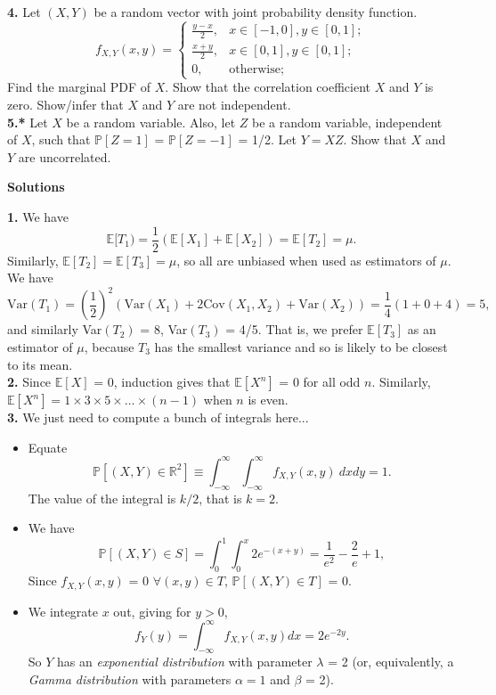 \documentclass[aps,prl,groupedaddress,amsmath,amssymb,nofootinbib,12pt]{revtex4-1}
\begin{document}
\textbf{4.} Let $(X, Y)$ be a random vector with joint probability density function.
\begin{equation}
f_{X,Y}(x,y) = \begin{cases} \frac{y-x}{2}, & x\in [-1,0], y\in [0,1];\\ \frac{x+y}{2}, & x\in [0,1], y\in [0,1];\\ 0, & \text{otherwise}; \end{cases}
\end{equation}
Find the marginal PDF of $X$. Show that the correlation coefficient $X$ and $Y$ is zero.
Show/infer that $X$ and $Y$ are not independent.\\

\textbf{5.*} Let $X$ be a random variable. Also, let $Z$ be a random variable, independent of $X$, such that $\mathbb{P}[Z =1]$ = $\mathbb{P}[Z =-1]$ = 1/2. Let $Y = XZ$. Show that $X$ and $Y$ are uncorrelated.
\pagebreak

\textbf{Solutions\\}

\textbf{1.} We have 
\[\mathbb{E}[T_1) = \frac{1}{2} (\mathbb{E}[X_1] + \mathbb{E}[X_2]) = \mathbb{E}[T_2] = \mu.\]
Similarly, $\mathbb{E}[T_2] = \mathbb{E}[T_3] = \mu$, so all are unbiased when used as estimators of $\mu$. We have 
\[\text{Var}(T_1) = \left(\frac{1}{2}\right)^2\left(\text{Var}(X_1) + 2 \text{Cov}(X_1, X_2) + \text{Var}(X_2)\right) = \frac{1}{4}(1 + 0 + 4) = 5,
\]
and similarly Var$(T_2)$ = 8, Var$(T_3)$ = 4/5. That is, we prefer $\mathbb{E}[T_3]$ as an estimator of $\mu$, because $T_3$ has the smallest variance and so is likely to be closest to its mean.\\

\textbf{2.} Since $\mathbb{E}[X]$ = 0, induction gives that $\mathbb{E}[X^n
]$ = 0 for all odd $n$. Similarly, $\mathbb{E}[X^n] = 1\times 3 \times 5 \times \ldots \times (n-1)$ when $n$ is even.\\

\textbf{3.} We just need to compute a bunch of integrals here...
\begin{itemize}
\item
Equate
\[\mathbb{P}[(X, Y ) \in \mathbb{R}^2] \equiv \int_{-\infty}^\infty\int_{-\infty}^\infty f_{X,Y} (x,y)~dxdy = 1.\]
The value of the integral is $k/2$, that is $k=2$.
\item We have
\[\mathbb{P}[(X, Y ) \in S] = \int_0^1\int_0^x 2e^{-(x+y)} = \frac{1}{e^2} -\frac{2}{e}+1,\]
Since $f_{X,Y} (x, y)$ = 0 $\forall (x, y) \in T$, $\mathbb{P}[(X, Y ) \in T]$ = 0.
\item
We integrate $x$ out, giving for $y > 0$,
\[f_Y(y) = \int_{-\infty}^\infty f_{X,Y} (x, y)dx = 2e^{-2y}.\]
So $Y$ has an \emph{exponential distribution} with parameter $\lambda$ = 2 (or, equivalently, a \emph{Gamma
distribution} with parameters $\alpha = 1$ and $\beta$ = 2).
\end{itemize}
\end{document}
